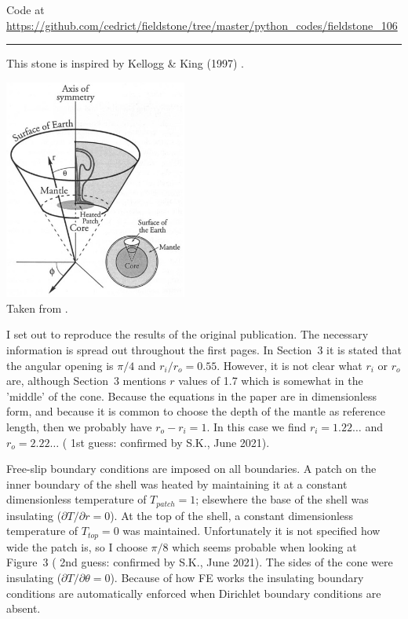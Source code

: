 

\begin{center}
Code at \url{https://github.com/cedrict/fieldstone/tree/master/python_codes/fieldstone_106}
\end{center}

\par\noindent\rule{\textwidth}{0.4pt}



This stone is inspired by Kellogg \& King (1997) \cite{keki97}. 

\begin{center}
\includegraphics[width=6cm]{python_codes/fieldstone_106/images/keki97a}\\
{\captionfont Taken from \cite{keki97}.}
\end{center}

I set out to reproduce the results of the original publication. 
The necessary information is spread out throughout the first pages.
In Section~3 it is stated that the angular opening is $\pi/4$ and $r_i/r_o=0.55$.
However, it is not clear what $r_i$ or $r_o$ are, although Section~3
mentions $r$ values of 1.7 which is somewhat in the 'middle' of the cone. 
Because the equations in the paper are in dimensionless form, and 
because it is common to choose the depth of the mantle as reference length, 
then we probably have $r_o-r_i=1$. In this case we find $r_i=1.22\dots$ and 
$r_o=2.22\dots$ ({\color{orange} 1st guess}: confirmed by S.K., June 2021).

Free-slip boundary conditions are imposed on all boundaries.
A patch on the inner boundary of the shell was heated by
maintaining it at a constant dimensionless temperature of $T_{patch}=1$; 
elsewhere the base of the shell was insulating ($\partial T/\partial r = 0$).
At the top of the shell, a constant dimensionless temperature of $T_{top}=0$ was maintained.
Unfortunately it is not specified how wide the patch is, so I choose 
$\pi/8$ which seems probable when looking at Figure~3 ({\color{orange} 2nd guess}: confirmed by S.K., June 2021).
The sides of the cone were insulating ($\partial T/\partial \theta =0$).
Because of how FE works the insulating boundary conditions are automatically enforced 
when Dirichlet boundary conditions are absent. 


